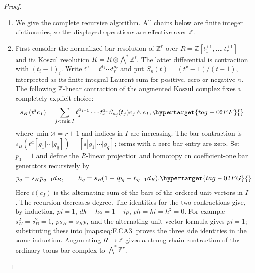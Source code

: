 \documentclass[11pt,a4paper]{article}
\numberwithin{equation}{section}
\theoremstyle{definition}
\begin{document}
\begin{proof}
\begin{enumerate}[label=\arabic*.]
\item We give the complete recursive algorithm.  All chains below are
finite integer dictionaries, so the displayed operations are
effective over $\mathbb Z$.

\item First consider the normalized bar resolution of $\mathbb Z^r$
over $R=\mathbb Z[t_1^{\pm1},\ldots,t_r^{\pm1}]$ and its Koszul
resolution $K=R\otimes\bigwedge^*\mathbb Z^r$.
The latter differential is contraction with $(t_i-1)_i$.
Write $t^a=t_1^{a_1}\cdots t_r^{a_r}$ and put
$S_n(t)=(t^n-1)/(t-1)$, interpreted as its finite integral
Laurent sum for positive, zero or negative $n$.
The following $\mathbb Z$-linear contraction of the augmented
Koszul complex fixes a completely explicit choice:
\begin{equation}
 s_K(t^a e_I)=
 \sum_{j<\min I}
 t_{j+1}^{a_{j+1}}\cdots t_r^{a_r}S_{a_j}(t_j)
 e_j\wedge e_I,                                           \hypertarget{tag-02FF}{}\label{maps:eq:F.CA2}
\end{equation}
where $\min\varnothing=r+1$ and indices in $I$ are increasing.
The bar contraction is
$s_B(t^a[g_1|\cdots|g_q])=[a|g_1|\cdots|g_q]$; terms with a
zero bar entry are zero.  Set $p_0=1$ and define the
$R$-linear projection and homotopy on coefficient-one bar
generators recursively by
\begin{equation}
 p_q=s_Kp_{q-1}d_B,
 \qquad
 h_q=s_B(1-ip_q-h_{q-1}d_B).                               \hypertarget{tag-02FG}{}\label{maps:eq:F.CA3}
\end{equation}
Here $i(e_I)$ is the alternating sum of the bars of the ordered
unit vectors in $I$.  The recursion decreases degree.  The
identities for the two contractions give, by induction,
$pi=1$, $dh+hd=1-ip$, $ph=hi=h^2=0$.
For example $s_K^2=s_B^2=0$, $ps_B=s_Kp$, and the alternating
unit-vector formula gives $pi=1$; substituting these into
\eqref{maps:eq:F.CA3} proves the three side identities in the same induction.
Augmenting $R\to\mathbb Z$ gives a strong chain contraction
of the ordinary torus bar complex to $\bigwedge^*\mathbb Z^r$.


\end{enumerate}
\end{proof}
\end{document}
